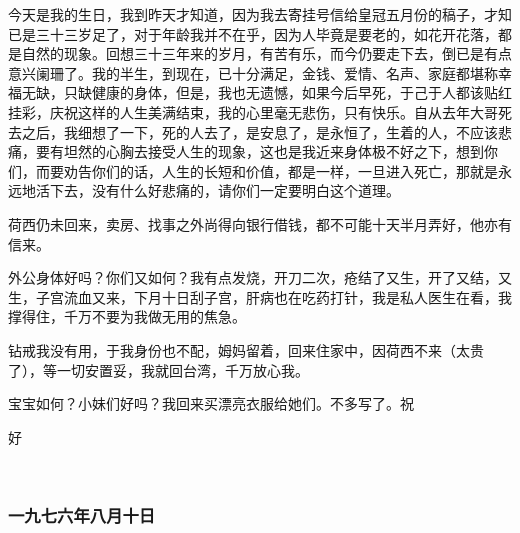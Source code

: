 \par {}
\par 今天是我的生日，我到昨天才知道，因为我去寄挂号信给皇冠五月份的稿子，才知已是三十三岁足了，对于年龄我并不在乎，因为人毕竟是要老的，如花开花落，都是自然的现象。回想三十三年来的岁月，有苦有乐，而今仍要走下去，倒已是有点意兴阑珊了。我的半生，到现在，已十分满足，金钱、爱情、名声、家庭都堪称幸福无缺，只缺健康的身体，但是，我也无遗憾，如果今后早死，于己于人都该贴红挂彩，庆祝这样的人生美满结束，我的心里毫无悲伤，只有快乐。自从去年大哥死去之后，我细想了一下，死的人去了，是安息了，是永恒了，生着的人，不应该悲痛，要有坦然的心胸去接受人生的现象，这也是我近来身体极不好之下，想到你们，而要劝告你们的话，人生的长短和价值，都是一样，一旦进入死亡，那就是永远地活下去，没有什么好悲痛的，请你们一定要明白这个道理。
\par 荷西仍未回来，卖房、找事之外尚得向银行借钱，都不可能十天半月弄好，他亦有信来。
\par 外公身体好吗？你们又如何？我有点发烧，开刀二次，疮结了又生，开了又结，又生，子宫流血又来，下月十日刮子宫，肝病也在吃药打针，我是私人医生在看，我撑得住，千万不要为我做无用的焦急。
\par 钻戒我没有用，于我身份也不配，姆妈留着，回来住家中，因荷西不来（太贵了），等一切安置妥，我就回台湾，千万放心我。
\par 宝宝如何？小妹们好吗？我回来买漂亮衣服给她们。不多写了。祝
\par 好
\par  
\par {}


\subsubsection{一九七六年八月十日}


